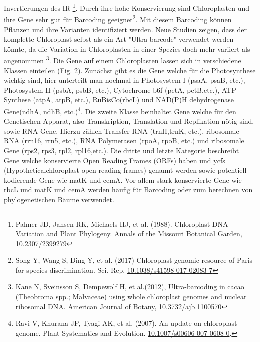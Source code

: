 \documentclass{scrartcl}
\begin{document}
Invertierungen des IR \footnote{Palmer JD, Jansen RK, Michaels HJ, et al. (1988).  Chloroplast DNA Variation and Plant Phylogeny. Annals of the Missouri Botanical Garden,  \url{10.2307/2399279}}. Durch ihre hohe Konservierung sind Chloroplasten und ihre Gene sehr gut für Barcoding geeignet\footnote{Song Y, Wang S, Ding Y, et al. (2017) Chloroplast genomic resource of Paris for species discrimination. Sci. Rep. \url{10.1038/s41598-017-02083-7}}. Mit diesem
Barcoding können Pflanzen und ihre Varianten identifiziert werden. Neue Studien zeigen, dass der komplette Chloroplast selbst als ein Art "Ultra-barcode"
verwendet werden könnte, da die Variation in Chloroplasten in einer Spezies doch mehr variiert als angenommen \footnote{Kane N, Sveinsson S, Dempewolf H, et al.(2012), Ultra-barcoding in cacao (Theobroma spp.; Malvaceae) using whole chloroplast genomes and nuclear ribosomal DNA. American Journal of Botany, \url{10.3732/ajb.1100570}}. 
Die Gene auf einem Chloroplasten lassen sich in verschiedene Klassen einteilen (Fig. 2). Zunächst gibt es die Gene welche für die Photosynthese wichtig sind,
hier unterteilt man nochmal in Photosystem I (psaA, psaB, etc.), Photosystem II (psbA, psbB, etc.), Cytochrome b6f (petA, petB,etc.), 
ATP Synthese (atpA, atpB, etc.), RuBisCo(rbcL) und NAD(P)H dehydrogenase Gene(ndhA, ndhB, etc.)\footnote{Ravi V, Khurana JP, Tyagi AK, et al. (2007). An update on chloroplast genome. Plant Systematics and Evolution. \url{10.1007/s00606-007-0608-0}.}. Die zweite Klasse beinhaltet Gene welche für den
Genetischen Apparat, also Transkription, Translation und Replikation nötig sind, sowie RNA Gene. Hierzu zählen Transfer RNA (trnH,trnK, etc.), ribosomale RNA (rrn16, rrn5, etc.), 
RNA Polymerasen (rpoA, rpoB, etc.) und ribosomale Gene (rps2, rps3, rpl2, rpl16,etc.). Die dritte und letzte Kategorie beschreibt Gene welche konservierte Open Reading Frames (ORFs) haben und
ycfs (Hypotheticalchloroplast open reading frames) genannt werden sowie potentiell kodierende Gene wie matK und cemA\footnotemark[12]{}. Vor allem stark konservierte Gene wie rbcL und matK und cemA werden 
häufig für Barcoding oder zum berechnen von phylogenetischen Bäume verwendet.
\end{document}
